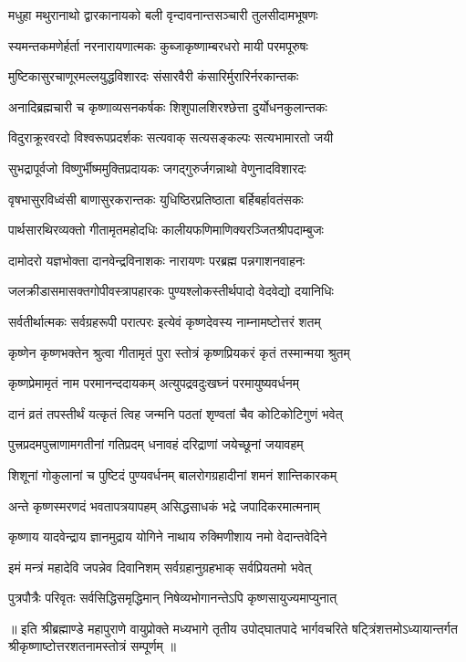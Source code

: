 \twolineshloka
{मधुहा मथुरानाथो द्वारकानायको बली}
{वृन्दावनान्तसञ्चारी तुलसीदामभूषणः}

\twolineshloka
{स्यमन्तकमणेर्हर्ता नरनारायणात्मकः}
{कुब्जाकृष्णाम्बरधरो मायी परमपूरुषः}

\twolineshloka
{मुष्टिकासुरचाणूरमल्लयुद्धविशारदः}
{संसारवैरी कंसारिर्मुरारिर्नरकान्तकः}

\twolineshloka
{अनादिब्रह्मचारी च कृष्णाव्यसनकर्षकः}
{शिशुपालशिरश्छेत्ता दुर्योधनकुलान्तकः}

\twolineshloka
{विदुराक्रूरवरदो विश्वरूपप्रदर्शकः}
{सत्यवाक् सत्यसङ्कल्पः सत्यभामारतो जयी}

\twolineshloka
{सुभद्रापूर्वजो विष्णुर्भीष्ममुक्तिप्रदायकः}
{जगद्गुरुर्जगन्नाथो वेणुनादविशारदः}

\twolineshloka
{वृषभासुरविध्वंसी बाणासुरकरान्तकः}
{युधिष्ठिरप्रतिष्ठाता बर्हिबर्हावतंसकः}

\twolineshloka
{पार्थसारथिरव्यक्तो गीतामृतमहोदधिः}
{कालीयफणिमाणिक्यरञ्जितश्रीपदाम्बुजः}

\twolineshloka
{दामोदरो यज्ञभोक्ता दानवेन्द्रविनाशकः}
{नारायणः परब्रह्म पन्नगाशनवाहनः}

\twolineshloka
{जलक्रीडासमासक्तगोपीवस्त्रापहारकः}
{पुण्यश्लोकस्तीर्थपादो वेदवेद्यो दयानिधिः}

\twolineshloka
{सर्वतीर्थात्मकः सर्वग्रहरूपी परात्परः}
{इत्येवं कृष्णदेवस्य नाम्नामष्टोत्तरं शतम्}

\twolineshloka
{कृष्णेन कृष्णभक्तेन श्रुत्वा गीतामृतं पुरा}
{स्तोत्रं कृष्णप्रियकरं कृतं तस्मान्मया श्रुतम्}

\twolineshloka
{कृष्णप्रेमामृतं नाम परमानन्ददायकम्}
{अत्युपद्रवदुःखघ्नं परमायुष्यवर्धनम्}

\twolineshloka
{दानं व्रतं तपस्तीर्थं यत्कृतं त्विह जन्मनि}
{पठतां शृण्वतां चैव कोटिकोटिगुणं भवेत्}

\twolineshloka
{पुत्त्रप्रदमपुत्त्राणामगतीनां गतिप्रदम्}
{धनावहं दरिद्राणां जयेच्छूनां जयावहम्}

\twolineshloka
{शिशूनां गोकुलानां च पुष्टिदं पुण्यवर्धनम्}
{बालरोगग्रहादीनां शमनं शान्तिकारकम्}

\twolineshloka
{अन्ते कृष्णस्मरणदं भवतापत्रयापहम्}
{असिद्धसाधकं भद्रे जपादिकरमात्मनाम्}

\twolineshloka
{कृष्णाय यादवेन्द्राय ज्ञानमुद्राय योगिने}
{नाथाय रुक्मिणीशाय नमो वेदान्तवेदिने}

\twolineshloka
{इमं मन्त्रं महादेवि जपन्नेव दिवानिशम्}
{सर्वग्रहानुग्रहभाक् सर्वप्रियतमो भवेत्}

\twolineshloka
{पुत्रपौत्रैः परिवृतः सर्वसिद्धिसमृद्धिमान्}
{निषेव्यभोगानन्तेऽपि कृष्णसायुज्यमाप्युनात्}

{॥ इति श्रीब्रह्माण्डे महापुराणे वायुप्रोक्ते मध्यभागे तृतीय उपोद्घातपादे भार्गवचरिते षट्त्रिंशत्तमोऽध्यायान्तर्गत श्रीकृष्णाष्टोत्तरशतनामस्तोत्रं सम्पूर्णम् ॥}